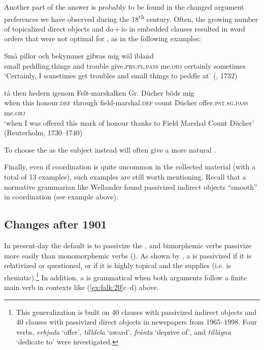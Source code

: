 \documentclass[output=paper]{langscibook}
\begin{document}
Another part of the answer is probably to be found in the changed argument preferences we have observed during the 18\textsuperscript{th} century. Often, the growing number of topicalized direct objects and do\,+\,io in embedded clauses resulted in word orders that were not optimal for , as in the following examples:


\ea%
    \label{ex:falk:26}

\ea
\gll Små  pillor          och  bekymmer  gifwas        mig    wäl ibland\\
      small  peddling.things  and  trouble     give.\textsc{prs.pl.pass}  me.\textsc{obj}  certainly              sometimes\\
\glt ‘Certainly, I sometimes get troubles and small things to peddle at’ (, 1732)

\ex
\gll tå    then  hedern    igenom  Felt-marskalken    Gr.      Dücher böds            mig\\
when  this  honour.\textsc{def}  through  field-marshal.\textsc{def}    count    Dücher      offer.\textsc{pst.sg.pass}    me\textsc{.obj}\\
\glt ‘when I was offered this mark of honour thanks to Field Marshal Count Dücher’ (Reuterholm, 1730–1740)
\z
\z


To choose the  as the subject instead will often give a more natural .


Finally, even if coordination is quite uncommon in the collected material (with a total of 13 examples), such examples are still worth mentioning. Recall that a normative grammarian like Wellander found passivized indirect objects “smooth” in coordination (see example  above).


\subsection{Changes after 1901}\label{sec:falk:5.3}


In present-day  the default is to passivize the , and bimorphemic verbs passivize more easily than monomorphemic  verbs (\citealt{HolmbergPlatzack1995,Lundquist2004,HaddicanHolmberg2019}). As shown by \citet{Lundquist2004}, a  is passivized if it is relativized or questioned, or if it is highly topical and the  supplies  (i.e. is rhematic).\footnote{This generalization is built on 40 clauses with passivized indirect objects and 40 clauses with passivized direct objects in newspapers from 1965–1998. Four verbs, \textit{erbjuda} ‘offer’, \textit{tilldela} ‘award’, \textit{frånta} ‘deprive of’, and \textit{tillägna} ‘dedicate to’ were investigated.} In addition, a  is grammatical when both arguments follow a finite main verb in contexts like (\ref{ex:falk:20}c–d) above. 
\end{document}

